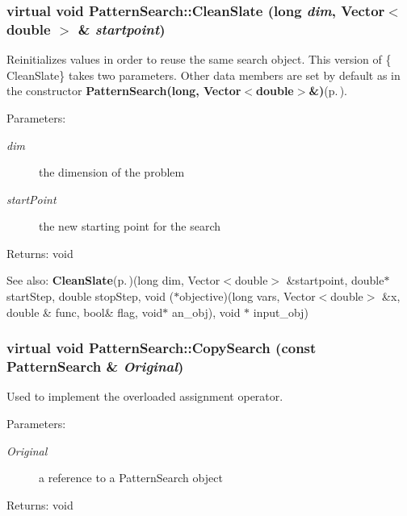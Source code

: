 \subsubsection{\setlength{\rightskip}{0pt plus 5cm}virtual void Pattern\-Search::Clean\-Slate (long {\em dim}, Vector$<$ double $>$ \& {\em startpoint})\hspace{0.3cm}{\tt  [virtual]}}\label{classPatternSearch_z17_1}


Reinitializes values in order to reuse the same search object. This version of \{ Clean\-Slate\} takes two parameters. Other data members are set by default as in the constructor {\bf Pattern\-Search(long, Vector$<$double$>$\&)}{\rm (p.\,\pageref{classPatternSearch_z15_0})}. \begin{Desc}
\item[Parameters:]
\begin{description}
\item[{\em dim}]the dimension of the problem \item[{\em start\-Point}]the new starting point for the search \end{description}
\end{Desc}
\begin{Desc}
\item[Returns:]void \end{Desc}
\begin{Desc}
\item[See also:]{\bf Clean\-Slate}{\rm (p.\,\pageref{classPatternSearch_z17_1})}(long dim, Vector$<$double$>$ \&startpoint, double$\ast$ start\-Step, double stop\-Step, void ($\ast$objective)(long vars, Vector$<$double$>$ \&x, double \& func, bool\& flag, void$\ast$ an\_\-obj), void $\ast$ input\_\-obj) \end{Desc}
\subsubsection{\setlength{\rightskip}{0pt plus 5cm}virtual void Pattern\-Search::Copy\-Search (const {\bf Pattern\-Search} \& {\em Original})\hspace{0.3cm}{\tt  [protected, virtual]}}\label{classPatternSearch_b2}


Used to implement the overloaded assignment operator. \begin{Desc}
\item[Parameters:]
\begin{description}
\item[{\em Original}]a reference to a Pattern\-Search object \end{description}
\end{Desc}
\begin{Desc}
\item[Returns:]void \end{Desc}
